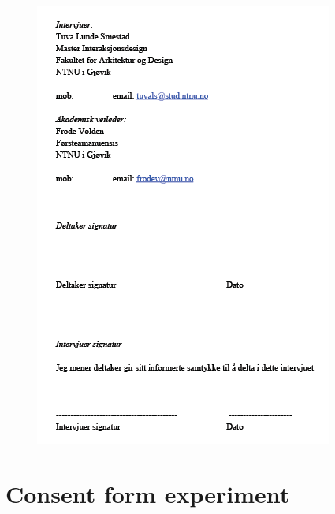     \begin{figure}[H]
        \centering
        \includegraphics[scale=0.8]{figures/samtykkside2.png}
    \end{figure}

\section{Consent form experiment}
    \label{consentexperiment}

